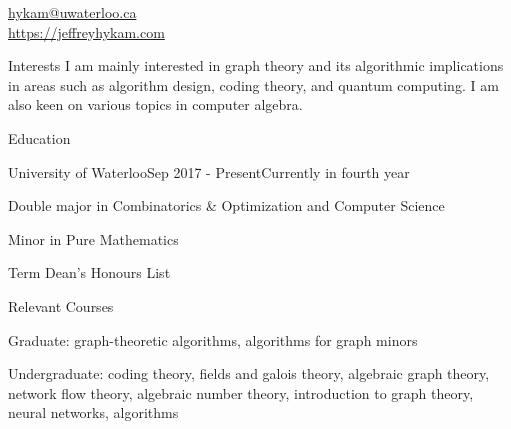 \documentclass{cv}
\begin{document}

\href{hykam@uwaterloo.ca}{hykam@uwaterloo.ca} \\
\href{https://jeffreyhykam.com}{https://jeffreyhykam.com}

\begin{rSection}{Interests}
	I am mainly interested in graph theory and its algorithmic implications in areas such as 
	algorithm design, coding theory, and quantum computing. I am also keen on various topics in computer algebra.
\end{rSection}

\begin{rSection}{Education}
\begin{rSubsection}{University of Waterloo}{Sep 2017 - Present}{Currently in fourth year}{}
	\item Double major in Combinatorics \& Optimization and Computer Science
	\item Minor in Pure Mathematics
	\item Term Dean's Honours List
\end{rSubsection}

\begin{rSubsection}{Relevant Courses}{}{}{}
	\item Graduate: graph-theoretic algorithms, algorithms for graph minors
	\item Undergraduate: coding theory, fields and galois theory, algebraic graph theory, network flow theory, 
	algebraic number theory, introduction to graph theory, neural networks, algorithms
\end{rSubsection}
\end{rSection}
\end{document}
